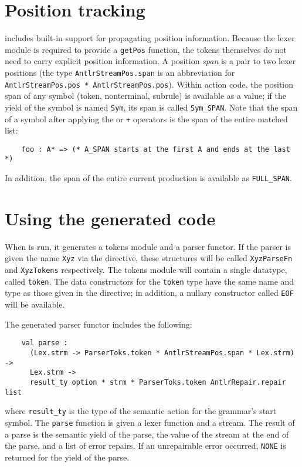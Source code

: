 \section{Position tracking}

\antlr{} includes built-in support for propagating position information.  Because the lexer module is required to provide a {\tt getPos} function, the tokens themselves do not need to carry explicit position information.
A position \emph{span} is a pair to two lexer positions (the type {\tt AntlrStreamPos.span} is an abbreviation for {\tt AntlrStreamPos.pos * AntlrStreamPos.pos}).
Within action code, the position span of any symbol (token, nonterminal, subrule) is available as a value; if the yield of the symbol is named {\tt Sym}, its span is called {\tt Sym\_SPAN}.
Note that the span of a symbol after applying the {\tt *} or {\tt +} operators is the span of the entire matched list:
\begin{verbatim}
    foo : A* => (* A_SPAN starts at the first A and ends at the last *)
\end{verbatim}
In addition, the span of the entire current production is available as {\tt FULL\_SPAN}.


\section{Using the generated code}\label{sec:antlr-gencode}

When \antlr{} is run, it generates a tokens module and a parser functor.
If the parser is given the name {\tt Xyz} via the  directive, these structures will be called {\tt XyzParseFn} and {\tt XyzTokens} respectively.  
The tokens module will contain a single datatype, called {\tt token}.  The data constructors for the {\tt token} type have the same name and type as those given in the  directive; in addition, a nullary constructor called {\tt EOF} will be available.

The generated parser functor includes the following:
\begin{verbatim}
    val parse : 
      (Lex.strm -> ParserToks.token * AntlrStreamPos.span * Lex.strm) -> 
      Lex.strm -> 
      result_ty option * strm * ParserToks.token AntlrRepair.repair list
\end{verbatim}
where {\tt result\_ty} is the type of the semantic action for the grammar's start symbol.  
The {\tt parse} function is given a lexer function and a stream.
The result of a parse is the semantic yield of the parse, the value of the stream at the end of the parse, and a list of error repairs.  
If an unrepairable error occurred, {\tt NONE} is returned for the yield of the parse.

